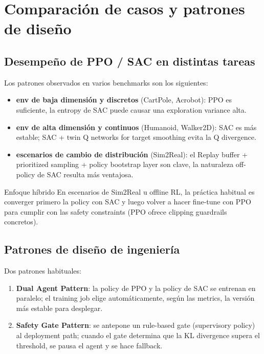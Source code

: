 \section{Comparación de casos y patrones de diseño}

\subsection{Desempeño de PPO / SAC en distintas tareas}

Los patrones observados en varios benchmarks son los siguientes:

\begin{itemize}
    \item \textbf{env de baja dimensión y discretos} (CartPole, Acrobot): PPO es suficiente, la entropy de SAC puede causar una exploration variance alta.
    \item \textbf{env de alta dimensión y continuos} (Humanoid, Walker2D): SAC es más estable; SAC + twin Q networks for target smoothing evita la Q divergence.
    \item \textbf{escenarios de cambio de distribución} (Sim2Real): el Replay buffer + prioritized sampling + policy bootstrap layer son clave, la naturaleza off-policy de SAC resulta más ventajosa.
\end{itemize}

\begin{importantbox}{Enfoque híbrido}
En escenarios de Sim2Real u offline RL, la práctica habitual es converger primero la policy con SAC y luego volver a hacer fine-tune con PPO para cumplir con las safety constraints (PPO ofrece clipping guardrails concretos).
\end{importantbox}

\subsection{Patrones de diseño de ingeniería}

Dos patrones habituales:

\begin{enumerate}
    \item \textbf{Dual Agent Pattern}: la policy de PPO y la policy de SAC se entrenan en paralelo; el training job elige automáticamente, según las metrics, la versión más estable para desplegar.
    \item \textbf{Safety Gate Pattern}: se antepone un rule-based gate (supervisory policy) al deployment path; cuando el gate determina que la KL divergence supera el threshold, se pausa el agent y se hace fallback.
\end{enumerate}

